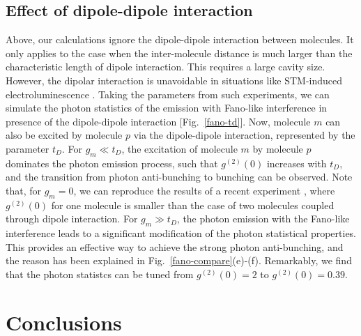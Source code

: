 \documentclass[aps,prb,
superscriptaddress,
,twocolumn
,floatfix,footinbib,longbibliography,
]{revtex4-2}
\newcommand{\revision}[1]{{\color{blue}{#1}}}
\begin{document}
 \subsection{Effect of dipole-dipole interaction}
 Above, our calculations ignore the dipole-dipole interaction between molecules. It only applies to the case when the inter-molecule distance is much larger than the characteristic length of dipole interaction. This requires a large cavity size. However, the dipolar interaction is unavoidable in situations like STM-induced electroluminescence \cite{zhang2016visualizing,PhysRevLett.122.233901}. Taking the parameters from such experiments, we can simulate the photon statistics of the emission with Fano-like interference in presence of the dipole-dipole interaction [Fig.~\ref{fano-td}]. Now, molecule $m$ can also be excited by molecule $p$ via the dipole-dipole interaction, represented by the parameter $t_{D}$. For $g_{m}\ll t_{D}$, the excitation of molecule $m$ by molecule $p$ dominates the photon emission process, such that $g^{(2)}(0)$ increases with $t_{D}$, and the transition from photon anti-bunching to bunching can be observed. Note that, for $g_{m}=0$, we can reproduce the results of a recent experiment \cite{PhysRevLett.122.233901}, where $g^{(2)}(0)$ for one molecule is smaller than the case of two molecules coupled through dipole interaction. For $g_{m}\gg t_{D}$, the photon emission with the Fano-like interference leads to a significant modification of the photon statistical properties. This provides an effective way to achieve the strong photon anti-bunching, and the reason has been explained in Fig.~\ref{fano-compare}(e)-(f). Remarkably, we find that the photon statistcs can be tuned from $g^{(2)}(0)=2$ to $g^{(2)}(0)=0.39$.


\section{Conclusions}
\revision{In summary, we provided unambiguous theoretical evidence for the role of the Fano-like interference effect on photon statistics in coupled molecule-cavity systems driven by electrical pumping. Only through the Fano-like effect, the photon statistics can be controlled from bunching and coherent to anti-bunching. We further proved that the anti-bunched behavior is survived even in presence of the direct dipolar coupling between molecules. A possible outlook is to use this effect for achieving nonclassical photons in electrically biased STM-molecule junctions.}
\end{document}
